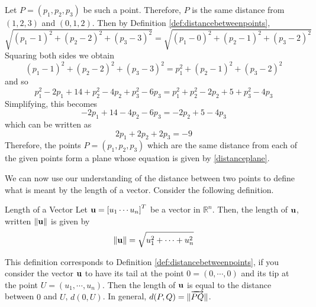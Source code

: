 \begin{solution}
Let $P = \left( p_1 , p_2, p_3\right) $ be such a point. Therefore, $P$ is the same distance from $\left(
1,2,3\right) $ and $\left( 0,1,2\right) .$
Then by Definition \ref{def:distancebetweenpoints},
\begin{equation*}
\sqrt{\left( p_1 -1\right) ^{2}+\left( p_2 -2\right) ^{2}+\left( p_3-3\right) ^{2}}=
\sqrt{\left( p_1 - 0 \right)^{2}+\left( p_2-1\right) ^{2}+\left( p_3-2\right) ^{2}}
\end{equation*}
Squaring both sides we obtain 
\begin{equation*}
\left( p_1 -1\right) ^{2}+\left( p_2 -2\right) ^{2}+\left( p_3 -3\right)
^{2}=p_1^{2}+\left( p_2-1\right) ^{2}+\left( p_3 -2\right) ^{2}
\end{equation*}
and so
\begin{equation*}
\allowbreak p_1^{2}-2p_1+14+p_2^{2}-4p_2+p_3^{2}-6p_3=p_1^{2}+p_2^{2}-2p_2+5+p_3^{2}-4p_3
\end{equation*}
Simplifying, this becomes
\begin{equation*}
-2p_1+14-4p_2-6p_3=-2p_2+5-4p_3
\end{equation*}
which can be written as 
\begin{equation}
2p_1+2p_2+2p_3=-9  \label{distanceplane}
\end{equation}
Therefore, the points $P = \left(
p_1,p_2,p_3\right) $  which are the same 
distance from each of the given points form a plane whose equation is given by \ref{distanceplane}.
\end{solution}

We can now use our understanding of the distance between two points to define what is meant by the length of a 
vector. Consider the following definition.  

\begin{definition}{Length of a Vector}\label{def:lengthofvector}
Let $\mathbf{u} = \left[ u_{1} \cdots u_{n} \right]^T$ be a vector in
$\mathbb{R}^n$. Then, the length of $\mathbf{u}$, written $\| \mathbf{u} \|$  is given by
\begin{equation*}
\|
\mathbf{u}
\|
= \sqrt{ u_{1}^2 + \cdots + u_{n}^2}
\end{equation*}
\end{definition}

This definition corresponds to Definition
\ref{def:distancebetweenpoints}, if you consider the vector $\mathbf{u}$
to have its tail at the point $0 = \left( 0, \cdots ,0 \right)$ and its
tip at the point $U = \left(u_1, \cdots, u_n \right)$.  Then the length of
$\mathbf{u}$ is equal to the distance between $0$ and $U$, $d(0,U)$. In general, $d(P,Q) = \| \overrightarrow{PQ} \|$. 

